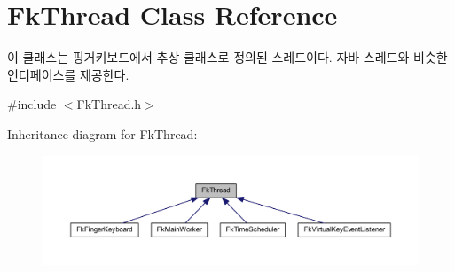\hypertarget{class_fk_thread}{}\section{Fk\+Thread Class Reference}
\label{class_fk_thread}


이 클래스는 핑거키보드에서 추상 클래스로 정의된 스레드이다. 자바 스레드와 비슷한 인터페이스를 제공한다.  




{\ttfamily \#include $<$Fk\+Thread.\+h$>$}



Inheritance diagram for Fk\+Thread\+:
\nopagebreak
\begin{figure}[H]
\begin{center}
\leavevmode
\includegraphics[width=350pt]{class_fk_thread__inherit__graph}
\end{center}
\end{figure}
